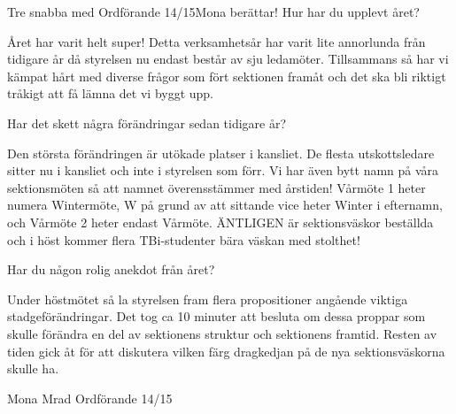 \begin{news}{3}{Tre snabba med Ordförande 14/15}{Mona berättar!}{}
Hur har du upplevt året?

Året har varit helt super! Detta
verksamhetsår har varit lite annorlunda från tidigare år då styrelsen
nu endast består av sju ledamöter. Tillsammans så har vi kämpat hårt
med diverse frågor som fört sektionen framåt och det ska bli riktigt
tråkigt att få lämna det vi byggt upp.

Har det skett några förändringar sedan tidigare år?

Den största
förändringen är utökade platser i kansliet. De flesta utskottsledare
sitter nu i kansliet och inte i styrelsen som förr. Vi har även bytt
namn på våra sektionsmöten så att namnet överensstämmer med årstiden!
Vårmöte 1 heter numera Wintermöte, W på grund av att sittande vice
heter Winter i efternamn, och Vårmöte 2 heter endast Vårmöte. ÄNTLIGEN är sektionsväskor beställda och i höst kommer flera TBi-studenter bära
väskan med stolthet!

Har du någon rolig anekdot från året?

Under höstmötet så la styrelsen
fram flera propositioner angående viktiga stadgeförändringar. Det tog
ca 10 minuter att besluta om dessa proppar som skulle förändra en del
av sektionens struktur och sektionens framtid. Resten av tiden gick
åt för att diskutera vilken färg dragkedjan på de nya sektionsväskorna
skulle ha.

Mona Mrad
Ordförande 14/15

\end{news}

